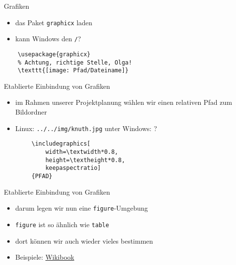 \begin{frame}[fragile]{Grafiken}
    \begin{itemize}[<+->]
        \item das Paket \texttt{graphicx} laden
        \item kann Windows den \texttt{/}?
    \end{itemize}
    \begin{lstlisting}
    \usepackage{graphicx}
    % Achtung, richtige Stelle, Olga!
    \texttt{[image: Pfad/Dateiname]}
    \end{lstlisting}
\end{frame}

\begin{frame}[fragile]{Etablierte Einbindung von Grafiken}
    \begin{itemize}[<+->]
        \item im Rahmen unserer Projektplanung wählen wir einen relativen Pfad zum Bildordner
        \item Linux: \texttt{../../img/knuth.jpg} unter Windows: ?
    \end{itemize}
        \begin{lstlisting}
        \includegraphics[
            width=\textwidth*0.8,
            height=\textheight*0.8,
            keepaspectratio]
        {PFAD}
        \end{lstlisting}
\end{frame}

\begin{frame}[fragile]{Etablierte Einbindung von Grafiken}
    \begin{itemize}[<+->]
        \item darum legen wir nun eine \texttt{figure}-Umgebung
        \item \texttt{figure} ist so ähnlich wie \texttt{table}
        \item dort können wir auch wieder vieles bestimmen
        \item Beispiele: \href{https://en.wikibooks.org/wiki/LaTeX/Floats,_Figures_and_Captions}{Wikibook}
    \end{itemize}
\end{frame}